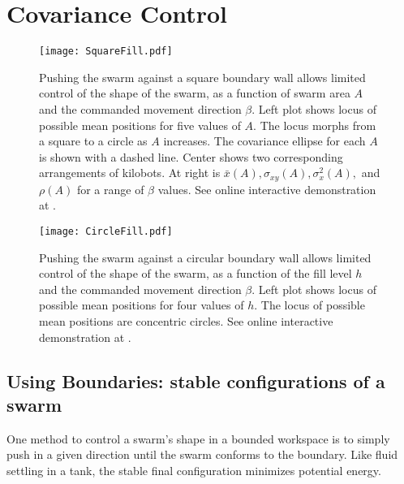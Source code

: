 \section{Covariance Control}
\label{sec:covControl}
\begin{figure*}[!htb]
\begin{center}
\texttt{[image: SquareFill.pdf]} 
\vspace{-1em}
\caption{Pushing the swarm against a square boundary wall allows limited control of the shape of the swarm, as a function of swarm area $A$ and the commanded movement direction $\beta$. Left plot shows locus of possible mean positions for five values of $A$.  The locus morphs from a square to a circle as $A$ increases.  The covariance ellipse for each $A$ is shown with a dashed line. Center shows two corresponding arrangements of kilobots.  At right is $\bar{x}(A), \sigma_{xy}(A), \sigma_x^2(A),$ and $\rho(A)$ for a range of $\beta$ values. See online interactive demonstration at \citep{Zhao2016mathematicaSquare}.}
\label{fig:SquareFill}
\end{center}
\end{figure*} 
\begin{figure*}[!htb]
\begin{center}
\vspace{-1em}
\texttt{[image: CircleFill.pdf]} 
\vspace{-1em}
\caption{Pushing the swarm against a circular boundary wall allows limited control of the shape of the swarm, as a function of the fill level $h$ and the commanded movement direction $\beta$. Left plot shows locus of possible mean positions for four values of $h$. The locus of possible mean positions are concentric circles. See online interactive demonstration at \citep{Zhao2016mathematica}.}  
\label{fig:CircleFill}
\end{center}
\vspace{-1em}
\end{figure*} 

\subsection{Using Boundaries: stable configurations of a swarm}\label{subsec:FluidInTank}
One method to control a swarm's shape in a bounded workspace is to simply push in a given direction until the swarm conforms to the boundary. Like fluid settling in a tank, the stable final configuration minimizes potential energy.
